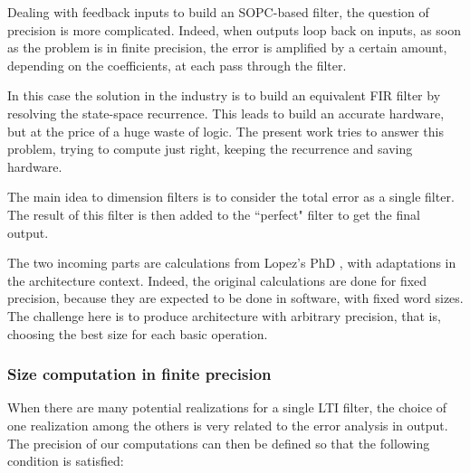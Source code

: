 	Dealing with feedback inputs to build an SOPC-based filter, the question of precision is more complicated.
	Indeed, when outputs loop back on inputs, as soon as the problem is in finite precision, the error is amplified by a certain amount, depending on the coefficients, at each pass through the filter.

	In this case the solution in the industry is to build an equivalent FIR filter by resolving the state-space recurrence.
	This leads to build an accurate hardware, but at the price of a huge waste of logic.
	The present work tries to answer this problem, trying to compute just right, keeping the recurrence and saving hardware.

	The main idea to dimension filters is to consider the total error as a single filter.
	The result of this filter is then added to the ``perfect" filter to get the final output.

	The two incoming parts are calculations from Lopez's PhD \cite{lopez}, with adaptations in the architecture context.
	Indeed, the original calculations are done for fixed precision, because they are expected to be done in software, with fixed word sizes.
	The challenge here is to produce architecture with arbitrary precision, that is, choosing the best size for each basic operation.





	\subsubsection{Size computation in finite precision}
	When there are many potential realizations for a single LTI filter, the choice of one realization
	among the others is very related to the error analysis in output.
	The precision of our computations can then be defined so that the following condition is satisfied:

